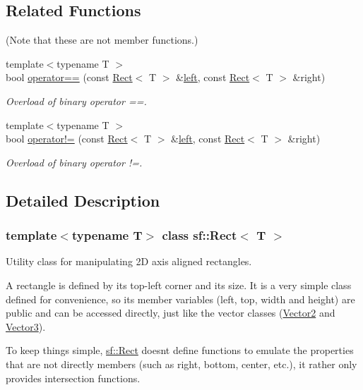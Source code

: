 \subsection*{Related Functions}
(Note that these are not member functions.) \begin{DoxyCompactItemize}
\item 
{\footnotesize template$<$typename T $>$ }\\bool \hyperlink{classsf_1_1_rect_ab3488b5dbd0e587c4d7cb80605affc46}{operator==} (const \hyperlink{classsf_1_1_rect}{Rect}$<$ T $>$ \&\hyperlink{classsf_1_1_rect_aa49960fa465103d9cb7069ceb25c7c32}{left}, const \hyperlink{classsf_1_1_rect}{Rect}$<$ T $>$ \&right)
\begin{DoxyCompactList}\small\item\em Overload of binary operator ==. \end{DoxyCompactList}\item 
{\footnotesize template$<$typename T $>$ }\\bool \hyperlink{classsf_1_1_rect_a03fc4c105687b7d0f07b6b4ed4b45581}{operator!=} (const \hyperlink{classsf_1_1_rect}{Rect}$<$ T $>$ \&\hyperlink{classsf_1_1_rect_aa49960fa465103d9cb7069ceb25c7c32}{left}, const \hyperlink{classsf_1_1_rect}{Rect}$<$ T $>$ \&right)
\begin{DoxyCompactList}\small\item\em Overload of binary operator !=. \end{DoxyCompactList}\end{DoxyCompactItemize}


\subsection{Detailed Description}
\subsubsection*{template$<$typename T$>$\newline
class sf\+::\+Rect$<$ T $>$}

Utility class for manipulating 2D axis aligned rectangles. 

A rectangle is defined by its top-\/left corner and its size. It is a very simple class defined for convenience, so its member variables (left, top, width and height) are public and can be accessed directly, just like the vector classes (\hyperlink{classsf_1_1_vector2}{Vector2} and \hyperlink{classsf_1_1_vector3}{Vector3}).

To keep things simple, \hyperlink{classsf_1_1_rect}{sf\+::\+Rect} doesn\textquotesingle{}t define functions to emulate the properties that are not directly members (such as right, bottom, center, etc.), it rather only provides intersection functions.

